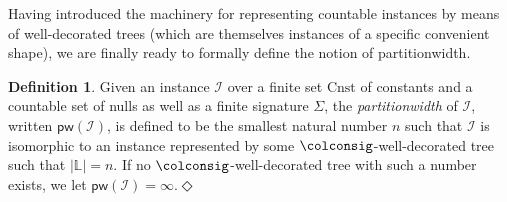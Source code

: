 \documentclass[10pt,a4paper]{amsart}
\theoremstyle{definition}
\numberwithin{equation}{section}
\theoremstyle{plain}
\theoremstyle{definition}
\newtheorem{definition}[definition]{Definition}
\theoremstyle{myexample}
\theoremstyle{plain}
\theoremstyle{definition}
\newcommand{\instance}{\mathcal{I}}
\newcommand{\cols}{\mathbb{L}}
\newcommand{\ercw}[1]{\pw{#1}}
\newcommand{\pw}[1]{\fcn{pw}(#1)}
\newcommand{\ercwidth}{\partitionwidth}
\newcommand{\partitionwidth}{par\-ti\-tion\-width}
\newcommand{\fcn}[1]{\mathsf{#1}}
\newcommand{\defend}{\hfill\ensuremath{\Diamond}}
\begin{document}
Having introduced the machinery for representing countable instances by means of well-decorated trees (which are themselves instances of a specific convenient shape), we are finally ready to formally define the notion of \partitionwidth{}.

\begin{definition}
Given an instance $\instance$ over a finite set $\mathrm{Cnst}$ of constants and a countable set of nulls as well as a finite signature $\Sigma$, the \emph{\ercwidth{}} of $\instance$, written $\ercw{\instance}$, is defined to be the smallest natural number $n$ such that $\instance$ is isomorphic to an instance represented by some $\colconsig$-well-decorated tree such that $|\cols|  =n$.
If no $\colconsig$-well-decorated tree with such a number exists, we let \mbox{$\ercw{\instance}= \infty$}.\defend
\end{definition}


%
\end{document}
